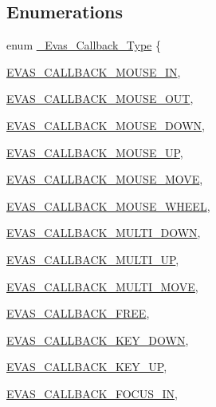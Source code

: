 \subsection*{Enumerations}
\begin{DoxyCompactItemize}
\item 
enum \hyperlink{Evas_8h_a99e208e463a20499aabe6faac8a8cb8a}{\_\-Evas\_\-Callback\_\-Type} \{ \par
\hyperlink{Evas_8h_a99e208e463a20499aabe6faac8a8cb8aa598c57bc146639618157159a319f11af}{EVAS\_\-CALLBACK\_\-MOUSE\_\-IN}, 
\par
\hyperlink{Evas_8h_a99e208e463a20499aabe6faac8a8cb8aa91aaa30a57047d0ee8a734e603751c25}{EVAS\_\-CALLBACK\_\-MOUSE\_\-OUT}, 
\par
\hyperlink{Evas_8h_a99e208e463a20499aabe6faac8a8cb8aa9fa52651ccf7e47cd3b7785fc4cf393f}{EVAS\_\-CALLBACK\_\-MOUSE\_\-DOWN}, 
\par
\hyperlink{Evas_8h_a99e208e463a20499aabe6faac8a8cb8aa8c1b22c99dd0231cd9ba1fecbffffac7}{EVAS\_\-CALLBACK\_\-MOUSE\_\-UP}, 
\par
\hyperlink{Evas_8h_a99e208e463a20499aabe6faac8a8cb8aa23fb97fb7cbccded54ccf3fc4e1dab8a}{EVAS\_\-CALLBACK\_\-MOUSE\_\-MOVE}, 
\par
\hyperlink{Evas_8h_a99e208e463a20499aabe6faac8a8cb8aa39d739f473db520ec4dfe0776ed43be4}{EVAS\_\-CALLBACK\_\-MOUSE\_\-WHEEL}, 
\par
\hyperlink{Evas_8h_a99e208e463a20499aabe6faac8a8cb8aab5bb0de31eaeed655255e71ffe518b80}{EVAS\_\-CALLBACK\_\-MULTI\_\-DOWN}, 
\par
\hyperlink{Evas_8h_a99e208e463a20499aabe6faac8a8cb8aa4328f52cfb700b5c705edf7173afdd94}{EVAS\_\-CALLBACK\_\-MULTI\_\-UP}, 
\par
\hyperlink{Evas_8h_a99e208e463a20499aabe6faac8a8cb8aa6d0ade7e69dc62f728fa2e29168e923f}{EVAS\_\-CALLBACK\_\-MULTI\_\-MOVE}, 
\par
\hyperlink{Evas_8h_a99e208e463a20499aabe6faac8a8cb8aaab869b5d534f02f1b3e151e2406a8c24}{EVAS\_\-CALLBACK\_\-FREE}, 
\par
\hyperlink{Evas_8h_a99e208e463a20499aabe6faac8a8cb8aa336b86bad4f145f84c155e4922335584}{EVAS\_\-CALLBACK\_\-KEY\_\-DOWN}, 
\par
\hyperlink{Evas_8h_a99e208e463a20499aabe6faac8a8cb8aac436b50ad665089f8a24b0fb827cec5f}{EVAS\_\-CALLBACK\_\-KEY\_\-UP}, 
\par
\hyperlink{Evas_8h_a99e208e463a20499aabe6faac8a8cb8aa819cf61e9d11012b7402338c2ccb7b97}{EVAS\_\-CALLBACK\_\-FOCUS\_\-IN}, 
\par

\end{DoxyCompactItemize}
